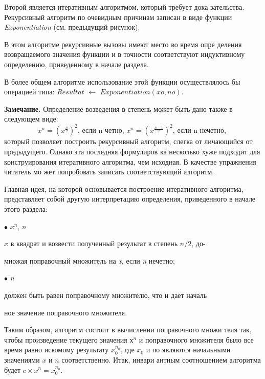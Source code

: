 Второй является итеративным алгоритмом, который требует дока­
зательства. Рекурсивный алгоритм по очевидным причинам записан в
виде функции \textit{Exponentiation} (см. предыдущий рисунок).

В этом алгоритме рекурсивные вызовы имеют место во время опре­
деления возвращаемого значения функции и в точности соответствуют
индуктивному определению, приведенному в начале раздела.

В более общем алгоритме использование этой функции осуществля­лось
 бы операцией типа: \textit{$Resultat$} $\leftarrow$ \textit{$Exponentiation(xo,no)$}.
\newline
\begin{center}
\parbox{11cm}
{
\textbf{Замечание.} Определение возведения в степень может быть дано
также в следующем виде:
\begin{equation*}
x^{n} = (x^{ \frac{n}{2} }) ^ {2} \text{, если n четно, } x^{n} = (x^{ \frac{n-1}{2} }) ^ {2}  \text{, если n нечетно, }
\end{equation*}
который позволяет построить рекурсивный алгоритм, слегка от­
личающийся от предыдущего. Однако эта последняя формулиров­
ка несколько хуже подходит для конструирования итеративного
алгоритма, чем исходная. В качестве упражнения читатель мо­
жет попробовать записать соответствующий алгоритм.
}
\end{center}
Главная идея, на которой основывается построение итеративного
алгоритма, представляет собой другую интерпретацию определения,
приведенного в начале этого раздела:

\qquad $\bullet$  \textit{$x^{n}$},  \textit{$n$} 

\qquad  \textit{$x$} в квадрат и возвести полученный результат в степень \textit{$n/2$}, до-

\qquad множая поправочный множитель на \textit{x}, если \textit{n} нечетно;

\qquad $\bullet$  \textit{n} 

\qquad должен быть равен поправочному множителю, что и дает началь­

\qquad ное значение поправочного множителя.

\noindent Таким образом, алгоритм состоит в вычислении поправочного множи­
теля так, чтобы произведение текущего значения \textit{$х^{n}$} и поправочного
множителя было все время равно искомому результату \textit{$x_{0}^{n_{0}}$}, где \textit{$x_{0}$} и по
являются начальными значениями \textit{$x$} и \textit{$n$} соответственно. Итак, инвари­
антным соотношением алгоритма будет \textit{$c \times x^{n} = x_0^{n_0}$}.
\pagebreak

